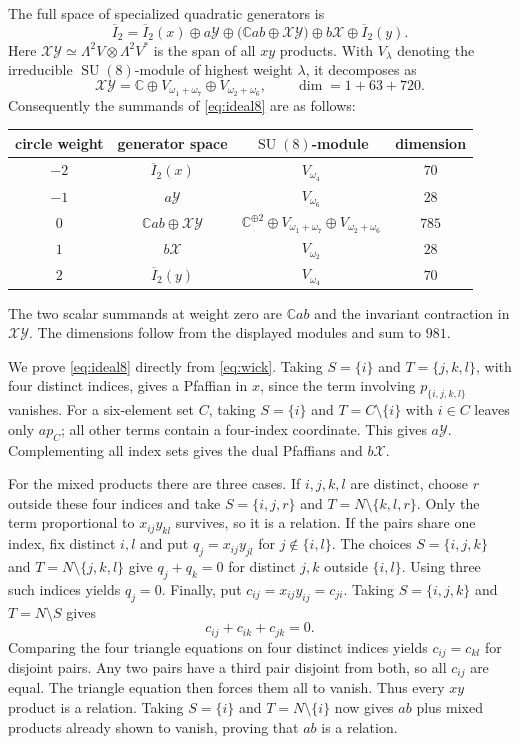 \documentclass[11pt]{article}
\newcommand{\C}{\mathbb C}
\newcommand{\SU}{\operatorname{SU}}
\theoremstyle{definition}
\numberwithin{equation}{section}
\begin{document}
The full space of specialized quadratic generators is
\begin{equation}\label{eq:ideal8}
 \overline I_2=\overline I_2(x)\oplus a\mathcal Y
 \oplus\bigl(\C ab\oplus\mathcal X\mathcal Y\bigr)
 \oplus b\mathcal X\oplus\overline I_2(y).
\end{equation}
Here $\mathcal X\mathcal Y\simeq\Lambda^2V\otimes\Lambda^2V^*$
is the span of all $xy$ products. With $V_\lambda$ denoting the
irreducible $\SU(8)$-module of highest weight $\lambda$, it decomposes as
\[
 \mathcal X\mathcal Y
 =\C\oplus V_{\omega_1+\omega_7}\oplus V_{\omega_2+\omega_6},
 \qquad \dim=1+63+720.
\]
Consequently the summands of \eqref{eq:ideal8} are as follows:
\begin{center}
\begin{tabular}{c c c c}
\toprule
circle weight & generator space & $\SU(8)$-module & dimension \\
\midrule
$-2$ & $\overline I_2(x)$ & $V_{\omega_4}$ & $70$ \\
$-1$ & $a\mathcal Y$ & $V_{\omega_6}$ & $28$ \\
$0$ & $\C ab\oplus\mathcal X\mathcal Y$
 & $\C^{\oplus2}\oplus V_{\omega_1+\omega_7}\oplus V_{\omega_2+\omega_6}$ & $785$ \\
$1$ & $b\mathcal X$ & $V_{\omega_2}$ & $28$ \\
$2$ & $\overline I_2(y)$ & $V_{\omega_4}$ & $70$ \\
\bottomrule
\end{tabular}
\end{center}
The two scalar summands at weight zero are $\C ab$ and the invariant
contraction in $\mathcal X\mathcal Y$. The dimensions follow from the
displayed modules and sum to $981$.

We prove \eqref{eq:ideal8} directly from \eqref{eq:wick}.
Taking $S=\{i\}$ and $T=\{j,k,l\}$, with four distinct indices,
gives a Pfaffian in $x$, since the term involving $p_{\{i,j,k,l\}}$
vanishes. For a six-element set $C$, taking $S=\{i\}$ and
$T=C\setminus\{i\}$ with $i\in C$ leaves only $ap_C$;
all other terms contain a four-index coordinate. This gives $a\mathcal Y$.
Complementing all index sets gives the dual Pfaffians and $b\mathcal X$.

For the mixed products there are three cases. If $i,j,k,l$ are distinct,
choose $r$ outside these four indices and take
$S=\{i,j,r\}$ and $T=N\setminus\{k,l,r\}$.
Only the term proportional to $x_{ij}y_{kl}$ survives, so it is a relation.
If the pairs share one index, fix distinct $i,l$ and put
$q_j=x_{ij}y_{jl}$ for $j\notin\{i,l\}$.
The choices $S=\{i,j,k\}$ and $T=N\setminus\{j,k,l\}$ give
$q_j+q_k=0$ for distinct $j,k$ outside $\{i,l\}$.
Using three such indices yields $q_j=0$.
Finally, put $c_{ij}=x_{ij}y_{ij}=c_{ji}$.
Taking $S=\{i,j,k\}$ and $T=N\setminus S$ gives
\[
 c_{ij}+c_{ik}+c_{jk}=0.
\]
Comparing the four triangle equations on four distinct indices yields
$c_{ij}=c_{kl}$ for disjoint pairs. Any two pairs have a third pair
disjoint from both, so all $c_{ij}$ are equal. The triangle equation
then forces them all to vanish. Thus every $xy$ product is a relation.
Taking $S=\{i\}$ and $T=N\setminus\{i\}$ now gives $ab$ plus
mixed products already shown to vanish, proving that $ab$ is a relation.
\end{document}

